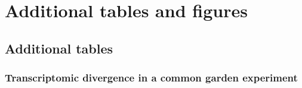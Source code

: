 
\chapter{Additional tables and figures}
\label{cha:add-tf}


\ifpdf
    \graphicspath{{9_backmatter/figures/PNG/}{9_backmatter/figures/PDF/}{9_backmatter/figures/}}
\else
    \graphicspath{{9_backmatter/figures/EPS/}{9_backmatter/figures/}}
\fi

\section{Additional tables}
\label{add-table}

\subsection{Transcriptomic divergence in a common garden experiment}

